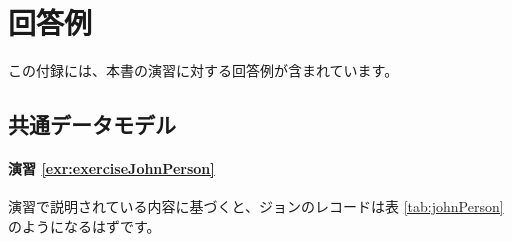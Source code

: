 \documentclass[
  11pt]{book}
\theoremstyle{definition}
\theoremstyle{definition}
\theoremstyle{definition}
\theoremstyle{definition}
\theoremstyle{remark}
\begin{document}
\chapter{回答例}\label{SuggestedAnswers}

この付録には、本書の演習に対する回答例が含まれています。

\section{共通データモデル}\label{Cdmanswers}

\subsubsection*{演習 \ref{exr:exerciseJohnPerson}}\label{ux6f14ux7fd2-refexrexercisejohnperson}

演習で説明されている内容に基づくと、ジョンのレコードは表 \ref{tab:johnPerson} のようになるはずです。
\end{document}
